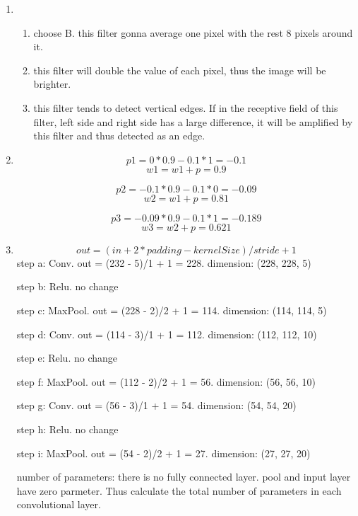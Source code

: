 \documentclass[12pt]{article}
\begin{document}
\begin{enumerate}
\item
\begin{enumerate}
\item choose B. this filter gonna average one pixel with the rest 8 pixels around it.
\item this filter will double the value of each pixel, thus the image will be brighter.
\item this filter tends to detect vertical edges. If in the receptive field of this filter, left side and right side has a large difference, it will be amplified by this filter and thus detected as an edge. 
\end{enumerate}

\item  
    $$ p1 = 0 * 0.9 - 0.1 * 1 = -0.1 $$
    $$ w1 = w1 + p = 0.9 $$

    $$ p2 = -0.1 * 0.9 - 0.1 * 0 = -0.09 $$
    $$ w2 = w1 + p = 0.81 $$

    $$ p3 = -0.09 * 0.9 - 0.1 * 1 = -0.189 $$
    $$ w3 = w2 + p  = 0.621 $$ 


\item
   $$ out = (in + 2 * padding - kernelSize)/stride + 1 $$
   step a: Conv. out = (232 - 5)/1 + 1 = 228. dimension: (228, 228, 5) 
   
   step b: Relu. no change
   
   step c: MaxPool. out = (228 - 2)/2 + 1 = 114. dimension: (114, 114, 5)
  
   step d: Conv. out = (114 - 3)/1 + 1 = 112. dimension: (112, 112, 10)

   step e: Relu. no change

   step f: MaxPool. out = (112 - 2)/2 + 1 = 56. dimension: (56, 56, 10)

    step g: Conv. out = (56 - 3)/1 + 1 = 54. dimension: (54, 54, 20)

    step h: Relu. no change

    step i: MaxPool. out = (54 - 2)/2 + 1 = 27. dimension: (27, 27, 20)

    number of parameters: there is no fully connected layer. pool and input layer have zero parmeter. Thus calculate the total number of parameters in each convolutional layer.


\end{enumerate}
\end{document}
